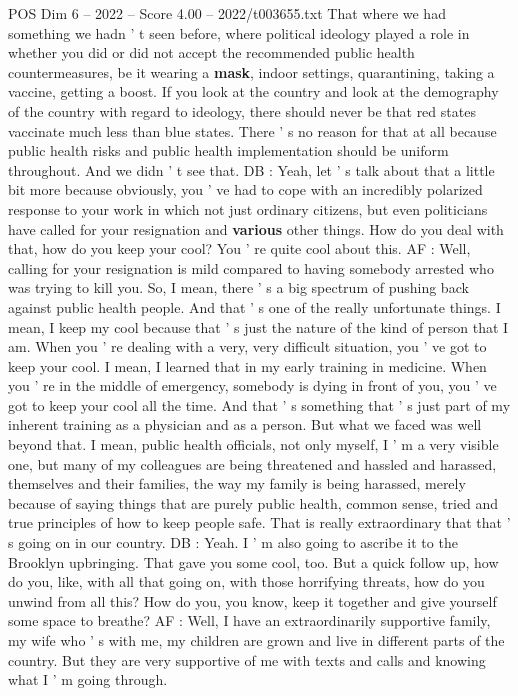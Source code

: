 \begin{textsample}{POS Dim 6 – 2022 – Score 4.00 – 2022/t003655.txt}
That where we had something we hadn ' t seen before, where political ideology played a role in whether you did or did not accept the recommended public health countermeasures, be it wearing a \textbf{mask}, indoor settings, quarantining, taking a vaccine, getting a boost.
If you look at the country and look at the demography of the country with regard to ideology, there should never be that red states vaccinate much less than blue states.
There ' s no reason for that at all because public health risks and public health implementation should be uniform throughout.
And we didn ' t see that.
DB : Yeah, let ' s talk about that a little bit more because obviously, you ' ve had to cope with an incredibly polarized response to your work in which not just ordinary citizens, but even politicians have called for your resignation and \textbf{various} other things.
How do you deal with that, how do you keep your cool?
You ' re quite cool about this.
AF : Well, calling for your resignation is mild compared to having somebody arrested who was trying to kill you.
So, I mean, there ' s a big spectrum of pushing back against public health people.
And that ' s one of the really unfortunate things.
I mean, I keep my cool because that ' s just the nature of the kind of person that I am.
When you ' re dealing with a very, very difficult situation, you ' ve got to keep your cool.
I mean, I learned that in my early training in medicine.
When you ' re in the middle of emergency, somebody is dying in front of you, you ' ve got to keep your cool all the time.
And that ' s something that ' s just part of my inherent training as a physician and as a person.
But what we faced was well beyond that.
I mean, public health officials, not only myself, I ' m a very visible one, but many of my colleagues are being threatened and hassled and harassed, themselves and their families, the way my family is being harassed, merely because of saying things that are purely public health, common sense, tried and true principles of how to keep people safe.
That is really extraordinary that that ' s going on in our country.
DB : Yeah.
I ' m also going to ascribe it to the Brooklyn upbringing.
That gave you some cool, too.
But a quick follow up, how do you, like, with all that going on, with those horrifying threats, how do you unwind from all this?
How do you, you know, keep it together and give yourself some space to breathe?
AF : Well, I have an extraordinarily supportive family, my wife who ' s with me, my children are grown and live in different parts of the country.
But they are very supportive of me with texts and calls and knowing what I ' m going through.

\end{textsample}
